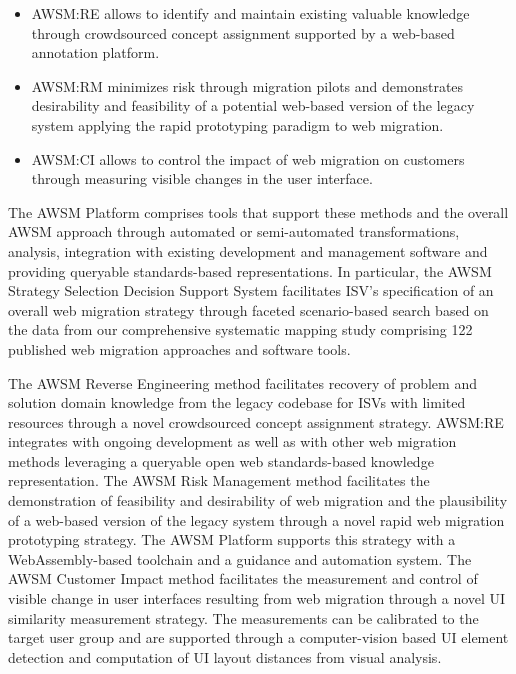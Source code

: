 \begin{itemize}
\tightlist
\item
  AWSM:RE allows to identify and maintain existing valuable knowledge through crowdsourced concept assignment supported by a web-based annotation platform.
\item
  AWSM:RM minimizes risk through migration pilots and demonstrates desirability and feasibility of a potential web-based version of the legacy system applying the rapid prototyping paradigm to web migration.
\item
  AWSM:CI allows to control the impact of web migration on customers through measuring visible changes in the user interface.
\end{itemize}

The AWSM Platform comprises tools that support these methods and the overall AWSM approach through automated or semi-automated transformations, analysis, integration with existing development and management software and providing queryable standards-based representations.
In particular, the AWSM Strategy Selection Decision Support System facilitates ISV's specification of an overall web migration strategy through faceted scenario-based search based on the data from our comprehensive systematic mapping study comprising 122 published web migration approaches and software tools.

The AWSM Reverse Engineering method facilitates recovery of problem and solution domain knowledge from the legacy codebase for ISVs with limited resources through a novel crowdsourced concept assignment strategy.
AWSM:RE integrates with ongoing development as well as with other web migration methods leveraging a queryable open web standards-based knowledge representation.
The AWSM Risk Management method facilitates the demonstration of feasibility and desirability of web migration and the plausibility of a web-based version of the legacy system through a novel rapid web migration prototyping strategy.
The AWSM Platform supports this strategy with a WebAssembly-based toolchain and a guidance and automation system.
The AWSM Customer Impact method facilitates the measurement and control of visible change in user interfaces resulting from web migration through a novel UI similarity measurement strategy.
The measurements can be calibrated to the target user group and are supported through a computer-vision based UI element detection and computation of UI layout distances from visual analysis.

